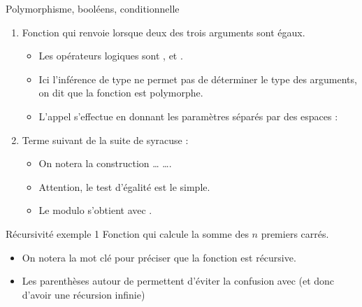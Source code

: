 \documentclass[10pt]{beamer}
\begin{document}
\begin{frame}{\Ctitle}{\stitle}
	\begin{exampleblock}{Polymorphisme, booléens, conditionnelle}
		\begin{enumerate}
			\item<1-> Fonction qui renvoie  lorsque deux  des trois arguments sont égaux.
				\begin{itemize}
					\item<2-> Les opérateurs logiques sont \kw{\&\&}, \kw{||} et .
					\item<3-> Ici l'inférence de type ne permet pas de déterminer le type des arguments, on dit que la fonction est \textcolor{BrickRed}{polymorphe}.
					\item<4-> L'appel s'effectue en donnant les paramètres séparés par des espaces : 
				\end{itemize}
			\item<5-> Terme suivant de la suite de syracuse :
				\begin{itemize}
					\item<6-> On notera la construction  \dots {} \dots {}.
					\item<7-> Attention, le test d'égalité est le \kw{=} simple.
					\item<8-> Le modulo s'obtient avec .
				\end{itemize}
		\end{enumerate}
	\end{exampleblock}
\end{frame}

\begin{frame}{\Ctitle}{\stitle}
	\begin{exampleblock}{Récursivité exemple 1}
		Fonction qui calcule la somme des $n$ premiers carrés.
		\begin{itemize}
			\item<2-> On notera la mot clé  pour préciser que la fonction est récursive.
			\item<3-> Les parenthèses autour de  permettent d'éviter la confusion avec  (et donc d'avoir une récursion infinie)
		\end{itemize}
	\end{exampleblock}
\end{frame}
\end{document}
